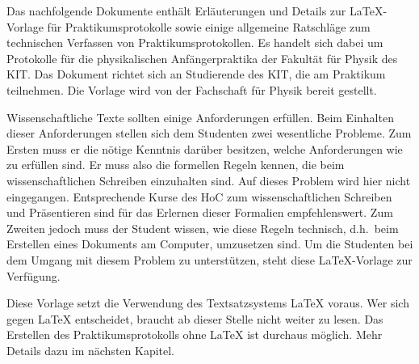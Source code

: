 Das nachfolgende Dokumente enthält Erläuterungen und Details zur LaTeX-Vorlage für Praktikumsprotokolle sowie einige allgemeine Ratschläge zum technischen Verfassen von Praktikumsprotokollen. Es handelt sich dabei um Protokolle für die physikalischen Anfängerpraktika der Fakultät für Physik des KIT. Das Dokument richtet sich an Studierende des KIT, die am Praktikum teilnehmen. Die Vorlage wird von der Fachschaft für Physik bereit gestellt.

Wissenschaftliche Texte sollten einige Anforderungen erfüllen. Beim Einhalten dieser Anforderungen stellen sich dem Studenten zwei wesentliche Probleme. Zum Ersten muss er die nötige Kenntnis darüber besitzen, welche Anforderungen wie zu erfüllen sind. Er muss also die formellen Regeln kennen, die beim wissenschaftlichen Schreiben einzuhalten sind. Auf dieses Problem wird hier nicht eingegangen. Entsprechende Kurse des HoC zum wissenschaftlichen Schreiben und Präsentieren sind für das Erlernen dieser Formalien empfehlenswert. Zum Zweiten jedoch muss der Student wissen, wie diese Regeln technisch, d.h.~beim Erstellen eines Dokuments am Computer, umzusetzen sind. Um die Studenten bei dem Umgang mit diesem Problem zu unterstützen, steht diese LaTeX-Vorlage zur Verfügung.

Diese Vorlage setzt die Verwendung des Textsatzsystems LaTeX voraus. Wer sich gegen LaTeX entscheidet, braucht ab dieser Stelle nicht weiter zu lesen. Das Erstellen des Praktikumsprotokolls ohne LaTeX ist durchaus möglich. Mehr Details dazu im nächsten Kapitel.